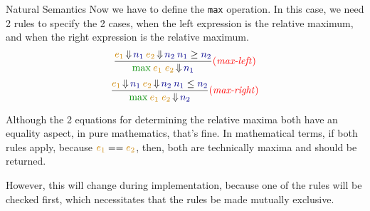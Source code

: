 \begin{example}[Lecture 3]{Natural Semantics}
  Now we have to define the \texttt{max} operation.
  In this case, we need 2 rules to specify the 2 cases, when the left expression is the relative maximum, and when the right expression is the relative maximum.
  \begin{equation*}
    \frac{\OrangeText{e_{1}} \EvaluatesTo \textcolor{Blue4}{n_{1}} \: \OrangeText{e_{2}} \EvaluatesTo \textcolor{Blue4}{n_{2}} \: \textcolor{Blue4}{n_{1}} \geq \textcolor{Blue4}{n_{2}}}{\SemanticInput{\mathtt{\max}} \: \OrangeText{e_{1}} \; \OrangeText{e_{2}} \EvaluatesTo \textcolor{Blue4}{n_{1}}} \SemanticRuleName{max-left}
  \end{equation*}
  \begin{equation*}
    \frac{\OrangeText{e_{1}} \EvaluatesTo \textcolor{Blue4}{n_{1}} \: \OrangeText{e_{2}} \EvaluatesTo \textcolor{Blue4}{n_{2}} \: \textcolor{Blue4}{n_{1}} \leq \textcolor{Blue4}{n_{2}}}{\SemanticInput{\mathtt{\max}} \: \OrangeText{e_{1}} \; \OrangeText{e_{2}} \EvaluatesTo \textcolor{Blue4}{n_{2}}} \SemanticRuleName{max-right}
  \end{equation*}
  \begin{remark*}
    Although the 2 equations for determining the relative maxima both have an equality aspect, in pure mathematics, that's fine.
    In mathematical terms, if both rules apply, because $\OrangeText{e_{1}} == \OrangeText{e_{2}}$, then, both are technically maxima and should be returned.

    However, this will change during implementation, because one of the rules will be checked first, which necessitates that the rules be made mutually exclusive.
  \end{remark*}


\end{example}
